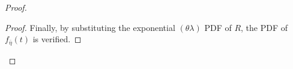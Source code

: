 \documentclass[conference]{IEEEtran}
\newcommand{\RY}[1]{{\color{red} RY: #1}}
\begin{document}
\begin{proof}
\begin{proof}
Finally, by substituting the exponential $(\theta\lambda)$ PDF of $R$, the PDF of $f_{\bar\eta}(t)$ is verified. 
%
\end{proof}

\end{proof}
\end{document}
